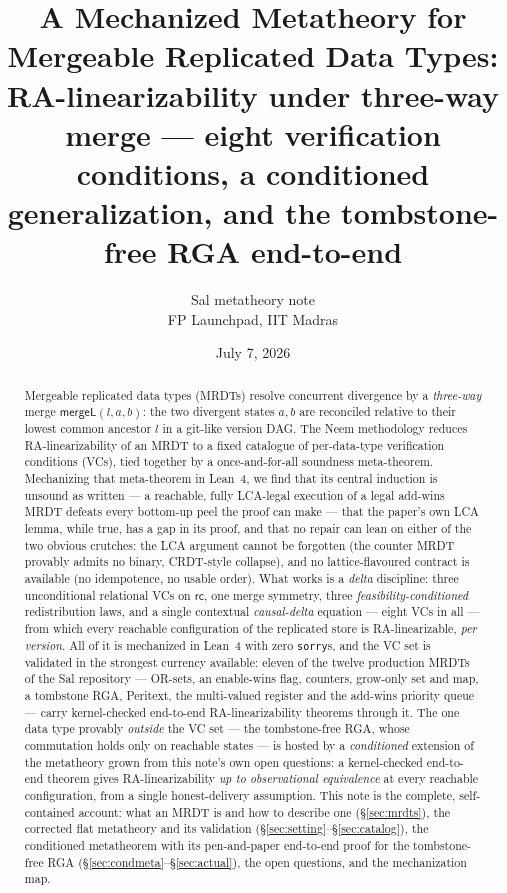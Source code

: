 \documentclass[11pt]{article}
\title{\bfseries A Mechanized Metatheory for Mergeable Replicated Data Types:\\
\large RA-linearizability under three-way merge --- eight verification
conditions, a conditioned generalization, and the tombstone-free RGA
end-to-end}
\author{Sal metatheory note\\ \small FP Launchpad, IIT Madras}
\date{July 7, 2026}
\newcommand{\mergeL}{\mathsf{mergeL}}
\newcommand{\lean}[1]{\texttt{#1}}
\begin{document}
\maketitle

\begin{abstract}
\noindent
Mergeable replicated data types (MRDTs) resolve concurrent divergence by a
\emph{three-way} merge $\mergeL(l,a,b)$: the two divergent states $a,b$
are reconciled relative to their lowest common ancestor $l$ in a git-like
version DAG. The Neem methodology reduces RA-linearizability of an MRDT to
a fixed catalogue of per-data-type verification conditions (VCs), tied
together by a once-and-for-all soundness meta-theorem. Mechanizing that
meta-theorem in Lean~4, we find that its central induction is unsound as
written --- a reachable, fully LCA-legal execution of a legal add-wins
MRDT defeats every bottom-up peel the proof can make --- that the paper's
own LCA lemma, while true, has a gap in its proof, and that no repair can
lean on either of the two obvious crutches: the LCA argument cannot be
forgotten (the counter MRDT provably admits no binary, CRDT-style
collapse), and no lattice-flavoured contract is available (no idempotence,
no usable order). What works
is a \emph{delta} discipline: three unconditional relational VCs on
$\mathsf{rc}$, one merge symmetry, three \emph{feasibility-conditioned}
redistribution laws, and a single contextual \emph{causal-delta} equation
--- eight VCs in all --- from which every reachable configuration of the
replicated store is RA-linearizable, \emph{per version}. All of it is
mechanized in Lean~4 with zero \lean{sorry}s, and the VC set is validated
in the strongest currency available: eleven of the twelve production MRDTs
of the Sal repository --- OR-sets, an enable-wins flag, counters, grow-only
set and map, a tombstone RGA, Peritext, the multi-valued register and the
add-wins priority queue --- carry kernel-checked end-to-end
RA-linearizability theorems through it. The one data type
provably \emph{outside} the VC set --- the tombstone-free RGA, whose
commutation holds only on reachable states --- is hosted by a
\emph{conditioned} extension of the metatheory grown from this note's own
open questions: a kernel-checked end-to-end theorem gives
RA-linearizability \emph{up to observational equivalence} at every
reachable configuration, from a single honest-delivery assumption. This
note is the complete, self-contained account: what an MRDT is and how to
describe one (\S\ref{sec:mrdts}), the corrected flat metatheory and its
validation (\S\ref{sec:setting}--\S\ref{sec:catalog}), the conditioned
metatheorem with its pen-and-paper end-to-end proof for the tombstone-free
RGA (\S\ref{sec:condmeta}--\S\ref{sec:actual}), the open questions, and
the mechanization map.
\end{abstract}
\end{document}
